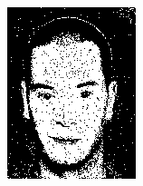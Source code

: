 \begin{figure}[h]
\begin{subfigure}[b]{0.18\textwidth}
         \includegraphics[width=\textwidth]{images/results/base/hh78.color.d3_bayes.png}
     \end{subfigure}
    \hfill
     \begin{subfigure}[b]{0.18\textwidth}
         \centering

\end{subfigure}
\end{figure}
